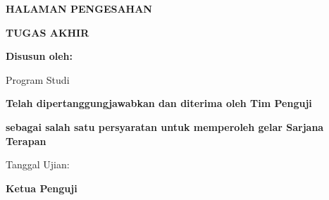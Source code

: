 \newpage
{}

{%
    \fontsize{12}{14.4}\selectfont
    \setlength{\parskip}{0pt}%
    \setlength{\parindent}{0pt}%
    \renewcommand{\baselinestretch}{1}\selectfont%
    \begin{center}
    \begin{singlespace}
    \textbf{\selectfont HALAMAN PENGESAHAN}\par
    \textbf{\selectfont TUGAS AKHIR}\par
    \vspace{\baselineskip}
    \textbf{\selectfont \judulid}\par
    \vspace{\baselineskip}
    \vspace{8pt}
    \textbf{\selectfont Disusun oleh:}\par
    \vspace{8pt}
    \penulis\par
    \nim\par
    Program Studi \prodi\par
    \vspace{2\baselineskip}
    \textbf{\selectfont Telah dipertanggungjawabkan dan diterima oleh Tim Penguji}\par
    \textbf{\selectfont sebagai salah satu persyaratan untuk memperoleh gelar Sarjana Terapan}\par
    Tanggal Ujian: \tglpengesahan\par
    \vspace{\baselineskip}
    \textbf{\selectfont Ketua Penguji}\par
    \vspace{2\baselineskip}
    \ketuapenguji\par

\end{singlespace}
\end{center}}
